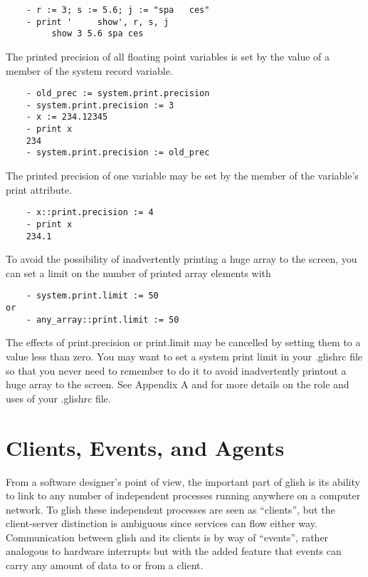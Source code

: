 \begin{verbatim}
	- r := 3; s := 5.6; j := "spa   ces"
	- print '     show', r, s, j
	     show 3 5.6 spa ces
\end{verbatim}

    The printed precision of all floating point variables is set by the
value of a member of the system record variable.

\begin{verbatim}
	- old_prec := system.print.precision
	- system.print.precision := 3
	- x := 234.12345
	- print x
	234
	- system.print.precision := old_prec
\end{verbatim}

    The printed precision of one variable may be set by the member of the
variable's print attribute.

\begin{verbatim}
	- x::print.precision := 4
	- print x
	234.1
\end{verbatim}

    To avoid the possibility of inadvertently printing a huge array to the
screen, you can set a limit on the number of printed array elements with

\begin{verbatim}
	- system.print.limit := 50
or
	- any_array::print.limit := 50
\end{verbatim}

The effects of print.precision or print.limit may be cancelled by setting
them to a value less than zero.  You may want to set a system print limit
in your .glishrc file so that you never need to remember to do it to
avoid inadvertently printout a huge array to the screen.  See
Appendix A and 
for more details on the role and uses of your .glishrc file.


\section{Clients, Events, and Agents}

    From a software designer's point of view, the important part of glish is
its ability to link to any number of independent processes running anywhere
on a computer network.  To glish these independent processes are seen as
``clients'', but the client-server distinction is ambiguous since services can
flow either way.  Communication between glish and its clients is by way of
``events'', rather analogous to hardware interrupts but with the added feature
that events can carry any amount of data to or from a client.

